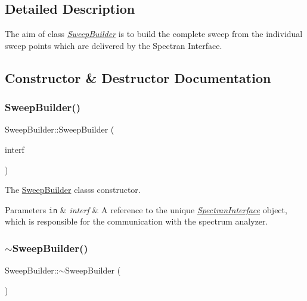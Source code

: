 \subsection{Detailed Description}
The aim of class {\itshape \hyperlink{classSweepBuilder}{Sweep\+Builder}} is to build the complete sweep from the individual sweep points which are delivered by the Spectran Interface. 

\subsection{Constructor \& Destructor Documentation}
\mbox{\label{classSweepBuilder_a41b1ecbd8c74953fe0ad5bfbf03be667}} 
\subsubsection{\texorpdfstring{Sweep\+Builder()}{SweepBuilder()}}
{\footnotesize\ttfamily Sweep\+Builder\+::\+Sweep\+Builder (\begin{DoxyParamCaption}\item[{\hyperlink{classSpectranInterface}{Spectran\+Interface} \&}]{interf }\end{DoxyParamCaption})\hspace{0.3cm}{\ttfamily [inline]}}



The \hyperlink{classSweepBuilder}{Sweep\+Builder} class\textquotesingle{}s constructor. 


\begin{DoxyParams}[1]{Parameters}
\mbox{\tt in}  & {\em interf} & A reference to the unique {\itshape \hyperlink{classSpectranInterface}{Spectran\+Interface}} object, which is responsible for the communication with the spectrum analyzer. \\
\hline
\end{DoxyParams}
\mbox{\label{classSweepBuilder_aa1be2613794ac488f3bf6c0b722c48d3}} 
\subsubsection{\texorpdfstring{$\sim$\+Sweep\+Builder()}{~SweepBuilder()}}
{\footnotesize\ttfamily Sweep\+Builder\+::$\sim$\+Sweep\+Builder (\begin{DoxyParamCaption}{ }\end{DoxyParamCaption})\hspace{0.3cm}{\ttfamily [inline]}}



